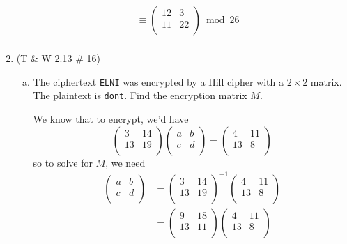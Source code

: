 \documentclass[12pt]{amsart}
\theoremstyle{plain}
\theoremstyle{definition}
\begin{document}
\begin{enumerate}[1.]
\begin{framed}
\begin{align*}
	&\equiv \left( \begin{array}{rr}12&3\\11&22\\\end{array}\right) \bmod 26\\
	\end{align*}
	\end{framed}
		\item (T \& W 2.13 \# 16)
		\begin{enumerate}[a.]
		\item The ciphertext \texttt{ELNI} was encrypted by a Hill cipher with a $2 \times 2$ matrix.  The plaintext is \texttt{dont}.  Find the encryption matrix $M$.
		\begin{framed}
		We know that to encrypt, we'd have $$\left( \begin{array}{rr}3&14\\13&19\\\end{array}\right)\left( \begin{array}{rr}a&b\\c&d\\\end{array}\right) = \left( \begin{array}{rr}4&11\\13&8\\\end{array}\right)$$
	so to solve for $M$, we need
		\begin{align*}
		\left( \begin{array}{rr}a&b\\c&d\\\end{array}\right) &= \left( \begin{array}{rr}3&14\\13&19\\\end{array}\right)^{-1}\left( \begin{array}{rr}4&11\\13&8\\\end{array}\right)\\
		&= \left( \begin{array}{rr}9&18\\13&11\\\end{array}\right)\left( \begin{array}{rr}4&11\\13&8\\\end{array}\right)\\

\end{align*}
\end{framed}
\end{enumerate}
\end{enumerate}
\end{document}
